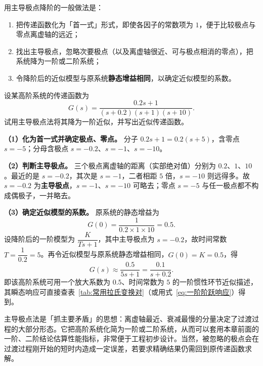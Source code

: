 \begin{tipbox}[处理方法]
用主导极点降阶的一般做法是：
\begin{enumerate}
\item 把传递函数化为「首一式」形式，即使各因子的常数项为 $1$，便于比较极点与零点离虚轴的远近；
\item 找出主导极点，忽略次要极点（以及离虚轴很近、可与极点相消的零点），把系统降为一阶或二阶系统；
\item 令降阶后的近似模型与原系统\textbf{静态增益相同}，以确定近似模型的系数。
\end{enumerate}
\end{tipbox}

\begin{longexample}[用主导极点降阶近似]
\label{exam:主导极点降阶}
设某高阶系统的传递函数为
\[
G(s)=\frac{0.2s+1}{\left(s+0.2\right)\left(s+1\right)\left(s+10\right)}.
\]
试用主导极点法将其降为一阶近似，并写出近似传递函数。
\begin{solution}
\textbf{（1）化为首一式并确定极点、零点。} 分子 $0.2s+1=0.2\left(s+5\right)$，含零点 $s=-5$；分母含极点 $s=-0.2$、$s=-1$、$s=-10$。

\textbf{（2）判断主导极点。} 三个极点离虚轴的距离（实部绝对值）分别为 $0.2$、$1$、$10$。最近的是 $s=-0.2$，其次是 $s=-1$，二者相距 $5$ 倍，$s=-10$ 则远得多。故 $s=-0.2$ 为\textbf{主导极点}，$s=-1$、$s=-10$ 可略去；零点 $s=-5$ 与任一极点都不构成偶极子，一并略去。

\textbf{（3）确定近似模型的系数。} 原系统的静态增益为
\[
G(0)=\frac{1}{0.2\times1\times10}=0.5.
\]
设降阶后的一阶模型为 $\dfrac{K}{Ts+1}$，其中主导极点为 $s=-0.2$，故时间常数 $T=\dfrac{1}{0.2}=5$。再令近似模型与原系统静态增益相同，$G(0)=K=0.5$，得
\[
G(s)\approx\frac{0.5}{5s+1}=\frac{0.1}{s+0.2}.
\]
即该高阶系统可用一个放大系数为 $0.5$、时间常数为 $5$ 的一阶惯性环节近似描述，其瞬态响应可直接查表~\ref{tab:常用拉氏变换对}（或用式~\eqref{eq:一阶阶跃响应}）得到。
\end{solution}
\end{longexample}

\begin{remark}
主导极点法是「抓主要矛盾」的思想：离虚轴最近、衰减最慢的分量决定了过渡过程的大部分形态。它把高阶系统化简为一阶或二阶系统，从而可以套用本章前面的一阶、二阶结论估算性能指标，非常便于工程初步设计。当然，被忽略的极点会在过渡过程刚开始的短时内造成一定误差，若要求精确结果仍需回到原传递函数求解。
\end{remark}
